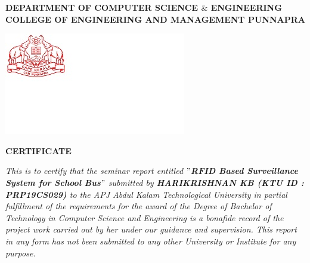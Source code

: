 



\begin{titlepage}
	\begin{center}
		\textbf{DEPARTMENT OF COMPUTER SCIENCE $\&$ ENGINEERING}\\[0.5cm]
		\textbf{ COLLEGE OF ENGINEERING AND MANAGEMENT PUNNAPRA}\\
		\vspace{1cm}
			\begin{center}
	\hspace{5cm}
	    	\includegraphics[]{am2.jpg}
	\end{center}
		\vspace{1cm}
		\textbf{CERTIFICATE}\\
	\end{center}
	\textit{\emph{This is to certify that the seminar report entitled {\textbf{$"$RFID Based Surveillance System for School Bus$"$}} submitted  by \textbf{HARIKRISHNAN KB (KTU ID : PRP19CS029)} to the APJ Abdul Kalam Technological University in partial fulfillment of the requirements for the award of the Degree of Bachelor of Technology in Computer Science and Engineering is a bonafide record of the project work carried out by her under our guidance and supervision. This report in any form  has not been submitted to any other University or Institute for any purpose. }}\\\\\\\\\\
	
	
	
	

\end{titlepage}
